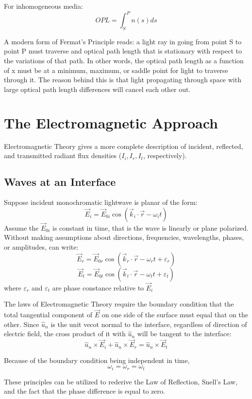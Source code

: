 \documentclass[12pt]{report}
\begin{document}
For inhomogeneous media:
\begin{equation}
OPL = \int_S^P n(s) ds
\end{equation}

A modern form of Fermat's Principle reads: a light ray in going from point S to point P must traverse and optical path length that is stationary with respect to the variations of that path. In other words, the optical path length as a function of x must be at a minimum, maximum, or saddle point for light to traverse through it. The reason behind this is that light propagating through space with large optical path length differences will cancel each other out. 

\section{The Electromagnetic Approach}
Electromagnetic Theory gives a more complete description of incident, reflected, and transmitted radiant flux densities ($I_i, I_r, I_t$, respectively).
\subsection{Waves at an Interface}
Suppose incident monochromatic lightwave is planar of the form:
\[\vec{E}_i = \vec{E}_{0i}\cos (\vec{k}_i\cdot\vec{r}-\omega_i t)\]
Assume the $\vec{E}_{0i}$ is constant in time, that is the wave is linearly or plane polarized. Without making assumptions about directions, frequencies, wavelengths, phases, or amplitudes, can write:
\[\vec{E}_r = \vec{E}_{0r}\cos (\vec{k}_r\cdot\vec{r}-\omega_r t+\varepsilon_r)\]
\[\vec{E}_t = \vec{E}_{0t}\cos (\vec{k}_t\cdot\vec{r}-\omega_t t+\varepsilon_t)\]
where $\varepsilon_r$ and $\varepsilon_t$ are phase constance relative to $\vec{E}_i$

The laws of Electromagnetic Theory require the boundary condition that the total tangential component of $\vec{E}$ on one side of the surface must equal that on the other. Since $\hat{u}_n$ is the unit vecot normal to the interface, regardless of direction of electric field, the cross product of it with $\hat{u}_n$ will be tangent to the interface:
\[\hat{u}_n\times\vec{E}_i+\hat{u}_n\times\vec{E}_r = \hat{u}_n\times \vec{E}_t\]

Because of the boundary condition being independent in time,
\[\omega_i = \omega_r = \omega_t\]

These principles can be utilized to rederive the Law of Reflection, Snell's Law, and the fact that the phase difference is equal to zero. 
\end{document}
